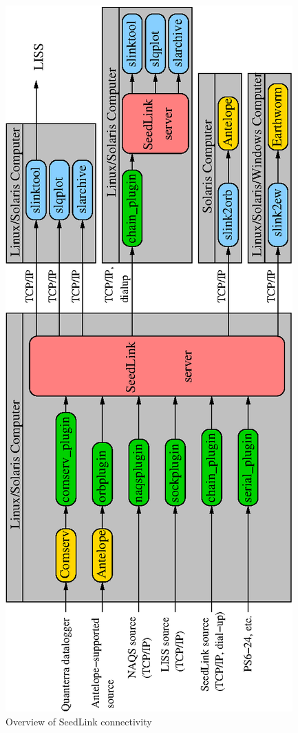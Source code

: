 \documentclass[11pt,a4paper,titlepage]{article}
\begin{document}
\begin{figure}[p!]
\centering
\includegraphics{overview.eps}
\caption{Overview of SeedLink connectivity} \label{overview}
\end{figure}
\end{document}
